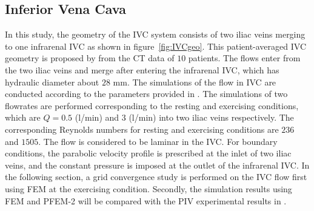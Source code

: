 \subsection{Inferior Vena Cava}

In this study, the geometry of the IVC system consists of two iliac veins merging to one infrarenal IVC as shown in figure~\ref{fig:IVCgeo}. This patient-averaged IVC geometry is proposed by \cite{gallagher_exp} from the CT data of $10$ patients. The flows enter from the two iliac veins and merge after entering the infrarenal IVC, which has hydraulic diameter about $28$ mm. 
The simulations of the flow in IVC are conducted according to the parameters provided in \cite{craven_cfd}. The simulations of two flowrates are performed corresponding to the resting and exercising conditions, which are $Q= 0.5$ (l/min) and $3$ (l/min) into two iliac veins respectively. The corresponding Reynolds numbers for resting and exercising conditions are $236$ and $1505$. The flow is considered to be laminar in the IVC. For boundary conditions, the parabolic velocity profile is prescribed at the inlet of two iliac veins, and the constant pressure is imposed at the outlet of the infrarenal IVC.
In the following section, a grid convergence study is performed on the IVC flow first using FEM at the exercising condition. Secondly, the simulation results using FEM and PFEM-2 will be compared with the PIV experimental results in \cite{gallagher_exp}. 

